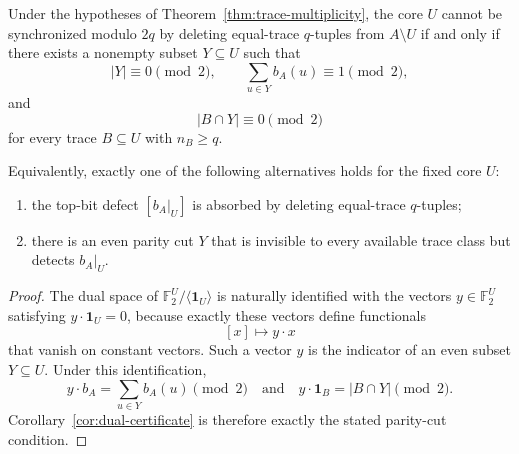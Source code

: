 \documentclass[thmsec,dntnbr,nolinenbrs]{dmgt}
\numberwithin{equation}{section}
\newcommand{\F}{\mathbb{F}}
\newcommand{\one}{\mathbf{1}}
\begin{document}
\begin{theorem}\label{thm:parity-cut}
Under the hypotheses of Theorem~\ref{thm:trace-multiplicity}, the core \(U\) cannot be synchronized modulo \(2q\) by deleting equal-trace \(q\)-tuples from \(A\setminus U\) if and only if there exists a nonempty subset \(Y\subseteq U\) such that
\[
        |Y|\equiv 0\pmod 2,\qquad
        \sum_{u\in Y} b_A(u)\equiv 1\pmod 2,
\]
and
\[
        |B\cap Y|\equiv 0\pmod 2
\]
for every trace \(B\subseteq U\) with \(n_B\ge q\).

Equivalently, exactly one of the following alternatives holds for the fixed core \(U\):
\begin{enumerate}[label=\textup{(\arabic*)}, leftmargin=*]
    \item the top-bit defect \([b_A|_U]\) is absorbed by deleting equal-trace \(q\)-tuples;
    \item there is an even parity cut \(Y\) that is invisible to every available trace class but detects \(b_A|_U\).
\end{enumerate}
\end{theorem}

\begin{proof}
The dual space of \(\F_2^U/\langle\one_U\rangle\) is naturally identified with the vectors \(y\in\F_2^U\) satisfying \(y\cdot\one_U=0\), because exactly these vectors define functionals
\[
        [x]\longmapsto y\cdot x
\]
that vanish on constant vectors.  Such a vector \(y\) is the indicator of an even subset \(Y\subseteq U\).  Under this identification,
\[
        y\cdot b_A=\sum_{u\in Y}b_A(u)\pmod 2
        \quad\text{and}\quad
        y\cdot\one_B=|B\cap Y|\pmod 2.
\]
Corollary~\ref{cor:dual-certificate} is therefore exactly the stated parity-cut condition.
\end{proof}
\end{document}
